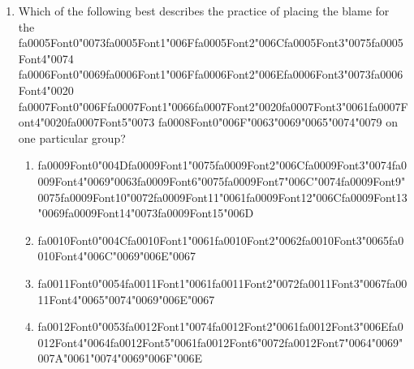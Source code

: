 \documentclass[12pt]{article}
\begin{document}
\begin{enumerate}[label=\arabic*.]
\begin{enumerate}[label=(\alph*)]
\end{enumerate}
\item Which of the following best describes the practice of placing the blame for the {\csname fa0005Font0\endcsname\char"0073}{\csname fa0005Font1\endcsname\char"006F}{\csname fa0005Font2\endcsname\char"006C}{\csname fa0005Font3\endcsname\char"0075}{\csname fa0005Font4\endcsname\char"0074} {\csname fa0006Font0\endcsname\char"0069}{\csname fa0006Font1\endcsname\char"006F}{\csname fa0006Font2\endcsname\char"006E}{\csname fa0006Font3\endcsname\char"0073}{\csname fa0006Font4\endcsname\char"0020} {\csname fa0007Font0\endcsname\char"006F}{\csname fa0007Font1\endcsname\char"0066}{\csname fa0007Font2\endcsname\char"0020}{\csname fa0007Font3\endcsname\char"0061}{\csname fa0007Font4\endcsname\char"0020}{\csname fa0007Font5\endcsname\char"0073} {\csname fa0008Font0\endcsname\char"006F}{\char"0063}{\char"0069}{\char"0065}{\char"0074}{\char"0079} on one particular group?
\begin{enumerate}[label=(\alph*)]
    \item {\csname fa0009Font0\endcsname\char"004D}{\csname fa0009Font1\endcsname\char"0075}{\csname fa0009Font2\endcsname\char"006C}{\csname fa0009Font3\endcsname\char"0074}{\csname fa0009Font4\endcsname\char"0069}{\char"0063}{\csname fa0009Font6\endcsname\char"0075}{\csname fa0009Font7\endcsname\char"006C}{\char"0074}{\csname fa0009Font9\endcsname\char"0075}{\csname fa0009Font10\endcsname\char"0072}{\csname fa0009Font11\endcsname\char"0061}{\csname fa0009Font12\endcsname\char"006C}{\csname fa0009Font13\endcsname\char"0069}{\csname fa0009Font14\endcsname\char"0073}{\csname fa0009Font15\endcsname\char"006D}
    \item {\csname fa0010Font0\endcsname\char"004C}{\csname fa0010Font1\endcsname\char"0061}{\csname fa0010Font2\endcsname\char"0062}{\csname fa0010Font3\endcsname\char"0065}{\csname fa0010Font4\endcsname\char"006C}{\char"0069}{\char"006E}{\char"0067}
    \item {\csname fa0011Font0\endcsname\char"0054}{\csname fa0011Font1\endcsname\char"0061}{\csname fa0011Font2\endcsname\char"0072}{\csname fa0011Font3\endcsname\char"0067}{\csname fa0011Font4\endcsname\char"0065}{\char"0074}{\char"0069}{\char"006E}{\char"0067}
    \item {\csname fa0012Font0\endcsname\char"0053}{\csname fa0012Font1\endcsname\char"0074}{\csname fa0012Font2\endcsname\char"0061}{\csname fa0012Font3\endcsname\char"006E}{\csname fa0012Font4\endcsname\char"0064}{\csname fa0012Font5\endcsname\char"0061}{\csname fa0012Font6\endcsname\char"0072}{\csname fa0012Font7\endcsname\char"0064}{\char"0069}{\char"007A}{\char"0061}{\char"0074}{\char"0069}{\char"006F}{\char"006E}
\end{enumerate}
\end{enumerate}
\end{document}
